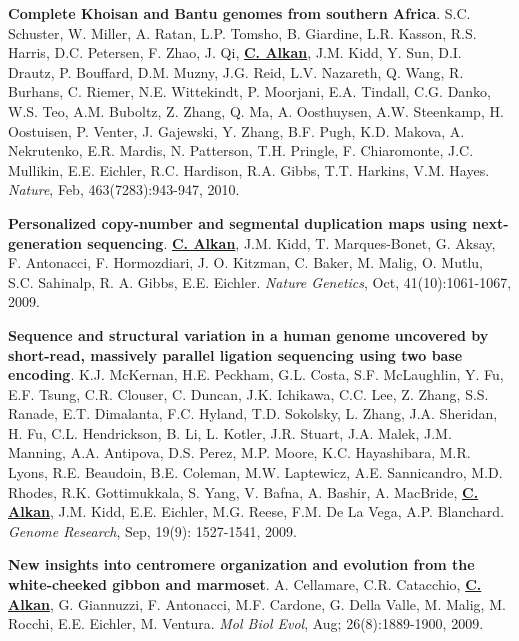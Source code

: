 \documentclass[margin,line]{res}
\begin{document}
\begin{resume}
\vspace{-.2cm}
{\bf Complete Khoisan and Bantu genomes from southern Africa}.
 S.C. Schuster, W. Miller, A. Ratan, L.P. Tomsho, B. Giardine, L.R. Kasson, R.S.
 Harris, D.C. Petersen, F. Zhao, J. Qi, {\bf \underline{C. Alkan}}, J.M. Kidd, Y. Sun, D.I. Drautz, 
P. Bouffard, D.M. Muzny, J.G. Reid, L.V. Nazareth, Q. Wang, R. Burhans, C. Riemer, 
N.E. Wittekindt, P. Moorjani, E.A. Tindall, C.G. Danko, W.S. Teo, A.M. Buboltz, 
Z. Zhang, Q. Ma, A. Oosthuysen, A.W. Steenkamp, H. Oostuisen, P. Venter, J. 
Gajewski, Y. Zhang, B.F. Pugh, K.D. Makova, A. Nekrutenko, E.R. Mardis, N. Patterson, 
T.H. Pringle, F. Chiaromonte, J.C. Mullikin, E.E. Eichler, R.C. Hardison, R.A. Gibbs, T.T. 
Harkins, V.M. Hayes. 
{\em Nature}, Feb, 463(7283):943-947, 2010.


\vspace{-.2cm}
{\bf Personalized copy-number and segmental duplication maps using next-generation sequencing}.
{\bf {\underline{C. Alkan}}}, J.M. Kidd, T. Marques-Bonet, G. Aksay, F. Antonacci, F. Hormozdiari, J. O. Kitzman, 
C. Baker, M. Malig, O. Mutlu, S.C. Sahinalp, R. A. Gibbs, E.E. Eichler.  
{\em Nature Genetics},  Oct, 41(10):1061-1067, 2009.\\


\vspace{-.2cm}
{\bf Sequence and structural variation in a human genome uncovered by short-read, massively parallel ligation sequencing using two base encoding}.
K.J. McKernan, H.E. Peckham, G.L. Costa, S.F. McLaughlin, Y. Fu, E.F. Tsung, C.R. Clouser, C. Duncan, J.K. Ichikawa, C.C. Lee, Z. Zhang, 
S.S. Ranade, E.T. Dimalanta,  F.C. Hyland, T.D. Sokolsky, L. Zhang, J.A. Sheridan, H. Fu, C.L. Hendrickson, B. Li, L. Kotler, J.R. Stuart, 
J.A. Malek, J.M. Manning, A.A. Antipova, D.S. Perez, M.P. Moore, K.C. Hayashibara, M.R. Lyons, R.E. Beaudoin, B.E. Coleman, M.W. Laptewicz, 
A.E. Sannicandro, M.D. Rhodes, R.K. Gottimukkala, S. Yang, V. Bafna, A. Bashir, A. MacBride, {\bf \underline{C. Alkan}}, J.M. Kidd, E.E. Eichler, 
M.G. Reese, F.M. De La Vega, A.P. Blanchard. 
{\em Genome Research}, Sep, 19(9): 1527-1541, 2009.

\vspace{-.2cm}
{\bf  New insights into centromere organization and evolution from the white-cheeked gibbon and marmoset}.
A. Cellamare,    C.R. Catacchio,  {\bf \underline{C. Alkan}}, G. Giannuzzi, F. Antonacci, M.F. Cardone, G. Della Valle, M. Malig, M. Rocchi, E.E. Eichler, M. Ventura.
{\em Mol Biol Evol}, Aug; 26(8):1889-1900, 2009.


\end{resume}
\end{document}
